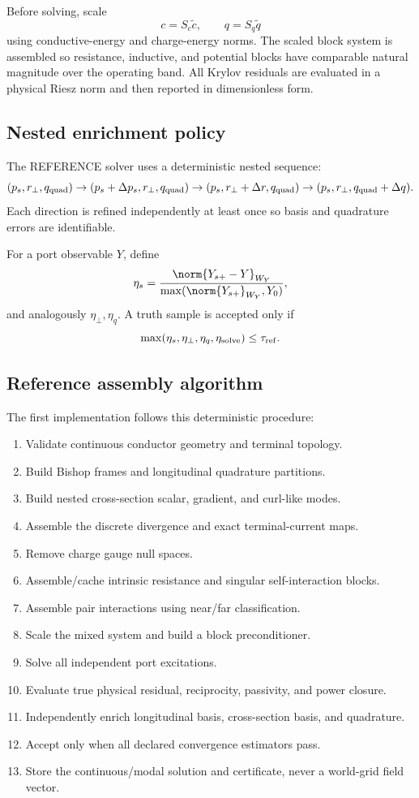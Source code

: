 Before solving, scale
\[
 c=S_c\widetilde c,\qquad
 q=S_q\widetilde q
\]
using conductive-energy and charge-energy norms. The scaled block system is
assembled so resistance, inductive, and potential blocks have comparable
natural magnitude over the operating band. All Krylov residuals are evaluated
in a physical Riesz norm and then reported in dimensionless form.

\subsection{Nested enrichment policy}

The REFERENCE solver uses a deterministic nested sequence:
\[
 (p_s,r_\perp,q_{\rm quad})
 \rightarrow
 (p_s+\Delta p_s,r_\perp,q_{\rm quad})
 \rightarrow
 (p_s,r_\perp+\Delta r,q_{\rm quad})
 \rightarrow
 (p_s,r_\perp,q_{\rm quad}+\Delta q).
\]
Each direction is refined independently at least once so basis and quadrature
errors are identifiable.

For a port observable $Y$, define
\[
 \eta_s
 =
 \frac{\norm{Y_{s+}-Y}_{W_Y}}
      {\max(\norm{Y_{s+}}_{W_Y},Y_0)},
\]
and analogously $\eta_\perp,\eta_q$. A truth sample is accepted only if
\[
 \max(\eta_s,\eta_\perp,\eta_q,\eta_{\rm solve})
 \le\tau_{\rm ref}.
\]

\subsection{Reference assembly algorithm}

The first implementation follows this deterministic procedure:

\begin{enumerate}
\item Validate continuous conductor geometry and terminal topology.
\item Build Bishop frames and longitudinal quadrature partitions.
\item Build nested cross-section scalar, gradient, and curl-like modes.
\item Assemble the discrete divergence and exact terminal-current maps.
\item Remove charge gauge null spaces.
\item Assemble/cache intrinsic resistance and singular self-interaction blocks.
\item Assemble pair interactions using near/far classification.
\item Scale the mixed system and build a block preconditioner.
\item Solve all independent port excitations.
\item Evaluate true physical residual, reciprocity, passivity, and power closure.
\item Independently enrich longitudinal basis, cross-section basis, and
      quadrature.
\item Accept only when all declared convergence estimators pass.
\item Store the continuous/modal solution and certificate, never a world-grid
      field vector.
\end{enumerate}

